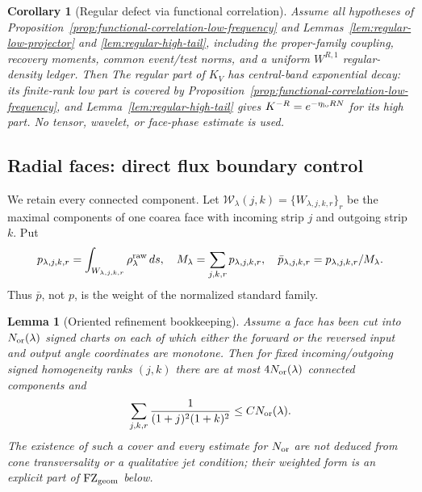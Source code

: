 \documentclass[11pt]{article}
\newtheorem{lemma}[theorem]{Lemma}
\newtheorem{corollary}[theorem]{Corollary}
\begin{document}
\begin{corollary}[Regular defect via functional correlation]
\label{cor:regular-functional-correlation}
Assume all hypotheses of
Proposition~\ref{prop:functional-correlation-low-frequency} and
Lemmas~\ref{lem:regular-low-projector} and
\ref{lem:regular-high-tail}, including the proper-family coupling,
recovery moments, common event/test norms, and a uniform
$W^{R,1}$ regular-density ledger.  Then
The regular part of $K_V$ has central-band exponential decay: its finite-rank
low part is covered by Proposition~\ref{prop:functional-correlation-low-frequency}, and
Lemma~\ref{lem:regular-high-tail} gives
$K^{-R}=e^{-\eta_{\rm lo}RN}$ for its high
part.  No tensor, wavelet, or face-phase estimate is used.
\end{corollary}

\subsection{Radial faces: direct flux boundary control}

We retain every connected component.  Let
$\mathcal W_\lambda(j,k)=\{W_{\lambda,j,k,r}\}_r$ be the maximal components
of one coarea face with incoming strip $j$ and outgoing strip $k$.  Put
\[
 p_{\lambda,j,k,r}=\int_{W_{\lambda,j,k,r}}\rho^{\rm raw}_\lambda\,ds,
 \quad M_\lambda=\sum_{j,k,r}p_{\lambda,j,k,r},\quad
 \bar p_{\lambda,j,k,r}=p_{\lambda,j,k,r}/M_\lambda.
\]
Thus $\bar p$, not $p$, is the weight of the normalized standard family.

\begin{lemma}[Oriented refinement bookkeeping]
\label{lem:cone-monotone-components}
Assume a face has been cut into $N_{\rm or}(\lambda)$ signed charts on each
of which either the forward or the reversed input and output angle
coordinates are monotone.  Then for fixed incoming/outgoing signed
homogeneity ranks $(j,k)$ there are at most $4N_{\rm or}(\lambda)$ connected
components and
\begin{equation}
\label{eq:derived-weighted-component-complexity}
 \sum_{j,k,r}\frac1{(1+j)^2(1+k)^2}
 \le C N_{\rm or}(\lambda).
\end{equation}
The existence of such a cover and every estimate for $N_{\rm or}$ are not
deduced from cone transversality or a qualitative jet condition; their
weighted form is an explicit part of $\mathrm{FZ}_{\rm geom}$ below.
\end{lemma}
\end{document}
